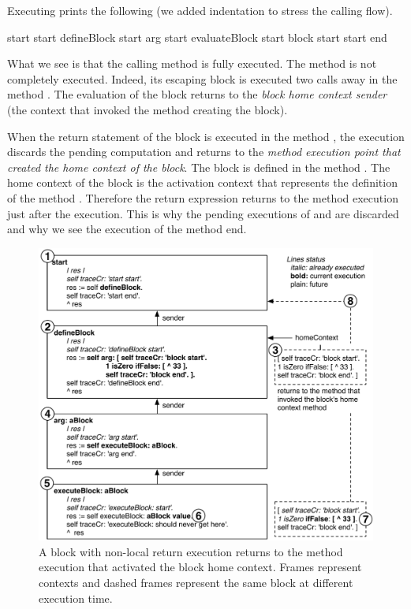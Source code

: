 \documentclass[a4paper,10pt,twoside]{book}
\begin{document}
Executing   prints the following (we added indentation to stress the calling flow).

\begin{code}{}
start start
   defineBlock start
      arg start
         evaluateBlock start
            block start
start end
\end{code}

What we see is that the calling method  is fully executed. The method  is not completely executed. Indeed, its escaping block \ct{[^33]} is executed two calls away in the method . The evaluation of the block returns to the \emph{block home context sender} (\ie the context that invoked the method creating the block).

When the return statement of the block is executed in the method , the execution discards the pending computation and returns to the \emph{method execution point that created the home context of the block}. The block is defined in  the method . The home context of the block is the activation context that represents the definition of the method . Therefore the return expression returns to the  method execution just after the  execution. This is why the pending executions of  and  are discarded and why we see the execution of the method  end.

\begin{figure}
\begin{center}\includegraphics[width=\textwidth]{nonLocalReturn2}
\caption{A block with non-local return execution returns to the method execution that activated the block home context. Frames represent contexts and dashed frames represent the same block at different execution time.\label{nonLocalReturn}}
\end{center}
\end{figure}
\end{document}
